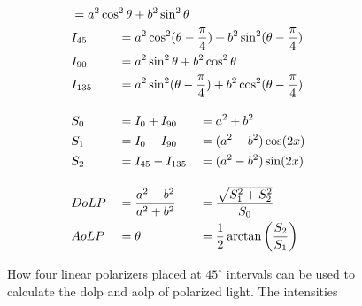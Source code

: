 \begin{figure}[H]
\begin{minipage}{.48\textwidth}
\begin{alignat}{3}
             & = \mathrlap{a^2\cos^2\theta + b^2\sin^2\theta                                } &
             &                                                                                  \\
             & I_{45}                                                                         &
             & = \mathrlap{a^2\cos^2(\theta-\frac{\pi}{4}) + b^2\sin^2(\theta-\frac{\pi}{4})} &
             &                                                                                  \\
             & I_{90}                                                                         &
             & = \mathrlap{a^2\sin^2\theta + b^2\cos^2\theta                                } &
             &                                                                                  \\
             & I_{135}                                                                        &
             & = \mathrlap{a^2\sin^2(\theta-\frac{\pi}{4}) + b^2\cos^2(\theta-\frac{\pi}{4})} &
             &                                                                                  \\[1em]
             & S_0                                                                            &
             & = I_0 + I_{90}                                                                 &
             & = a^2+b^2                                                                        \\
             & S_1                                                                            &
             & = I_0 - I_{90}                                                                 &
             & =(a^2-b^2)\cos(2x)                                                               \\
             & S_2                                                                            &
             & = I_{45} - I_{135}                                                             &
             & =(a^2-b^2)\sin(2x)                                                               \\[1em]
             & DoLP                                                                           &
             & =\frac{a^2-b^2}{a^2+b^2}                                                       &
             & = \frac{\sqrt{S_1^2 + S_2^2}}{S_0}                                               \\
             & AoLP                                                                           &
             & =  \theta                                                                      &
             & = \frac{1}{2}\arctan{\left(\frac{S_2}{S_1}\right)}
        \end{alignat}
    \end{minipage}%

    \caption{How four linear polarizers placed at $45^\circ$ intervals can be used to calculate the \gls{dolp} and \gls{aolp} of polarized light. The intensities  \label{fig:polarization_calculation}}
\end{figure}

